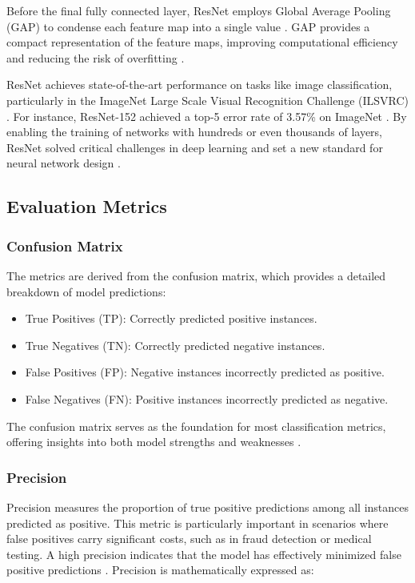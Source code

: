 Before the final fully connected layer, ResNet employs Global Average Pooling (GAP) to condense each feature map into a single value \cite{he2015deepresiduallearningimage}. GAP provides a compact representation of the feature maps, improving computational efficiency and reducing the risk of overfitting \cite{he2015deepresiduallearningimage}. 

ResNet achieves state-of-the-art performance on tasks like image classification, particularly in the ImageNet Large Scale Visual Recognition Challenge (ILSVRC) \cite{he2015deepresiduallearningimage}. For instance, ResNet-152 achieved a top-5 error rate of 3.57\% on ImageNet \cite{he2015deepresiduallearningimage}. By enabling the training of networks with hundreds or even thousands of layers, ResNet solved critical challenges in deep learning and set a new standard for neural network design \cite{he2015deepresiduallearningimage}.



\subsection{Evaluation Metrics}

\subsubsection{Confusion Matrix}
The metrics are derived from the confusion matrix, which provides a detailed breakdown of model predictions:
\begin{itemize}
    \item True Positives (TP): Correctly predicted positive instances.
    \item True Negatives (TN): Correctly predicted negative instances.
    \item False Positives (FP): Negative instances incorrectly predicted as positive.
    \item False Negatives (FN): Positive instances incorrectly predicted as negative.
\end{itemize}

The confusion matrix serves as the foundation for most classification metrics, offering insights into both model strengths and weaknesses \cite{article,dalianis2018clinical}.

\subsubsection{Precision}
Precision measures the proportion of true positive predictions among all instances predicted as positive. This metric is particularly important in scenarios where false positives carry significant costs, such as in fraud detection or medical testing. A high precision indicates that the model has effectively minimized false positive predictions \cite{article}. Precision is mathematically expressed as: 

